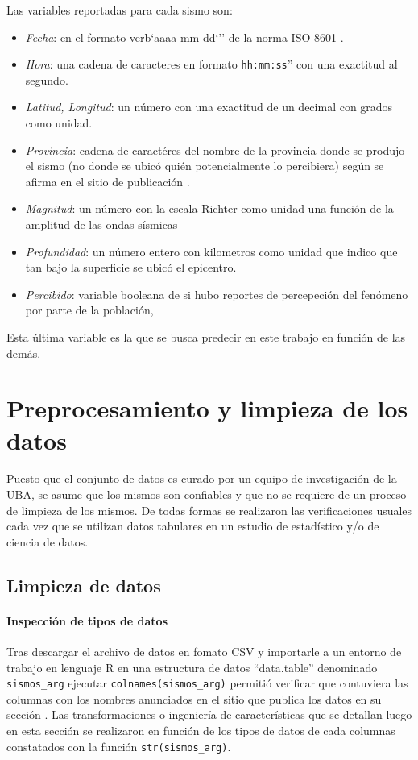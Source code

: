 \documentclass[a4paper]{report}
\begin{document}
Las variables reportadas para cada sismo son:
\begin{itemize}
	\item \emph{Fecha}: en el formato verb`aaaa-mm-dd`'' de la norma ISO 8601 \cite{noauthor_iso_2019}.
	\item \emph{Hora}: una cadena de caracteres en formato \verb`hh:mm:ss`'' con una exactitud al segundo.
	\item \emph{Latitud, Longitud}: un número con una exactitud de un decimal con grados como unidad.
	\item \emph{Provincia}: cadena de caractéres del nombre de la provincia donde se produjo el sismo (no donde se ubicó quién potencialmente lo percibiera) según se afirma en el sitio de publicación \cite[5.1.1]{daniela_parada_ic-datasets-docencia_nodate}.
	\item \emph{Magnitud}: un número con la escala Richter como unidad una función de la amplitud de las ondas sísmicas \cite[sección 4.2.3]{fowler_solid_1990}
	\item \emph{Profundidad}: un número entero con kilometros como unidad que indico que tan bajo la superficie se ubicó el epicentro.
	\item \emph{Percibido}: variable booleana de si hubo reportes de percepeción del fenómeno por parte de la población, 
\end{itemize}
Esta última variable es la que se busca predecir en este trabajo en función de las demás. 



\section{Preprocesamiento y limpieza de los datos}

Puesto que el conjunto de datos es curado por un equipo de investigación de la UBA, se asume que los mismos son confiables y que no se requiere de un proceso de limpieza de los mismos.
De todas formas se realizaron las verificaciones usuales cada vez que se utilizan datos tabulares en un estudio de estadístico y/o de ciencia de datos.


\subsection{Limpieza de datos}

\paragraph{Inspección de tipos de datos}
Tras descargar el archivo de datos en fomato CSV y importarle a un entorno de trabajo en lenguaje R en una estructura de datos ``data.table'' denominado \verb'sismos_arg' ejecutar \verb'colnames(sismos_arg)' permitió verificar que contuviera las columnas con los nombres anunciados en el sitio que publica los datos en su sección \cite[Exploración inicial]{daniela_parada_ic-datasets-docencia_nodate}.
Las transformaciones o ingeniería de características que se detallan luego en esta sección se realizaron en función de los tipos de datos de cada columnas constatados con la función \verb'str(sismos_arg)'.
\end{document}
